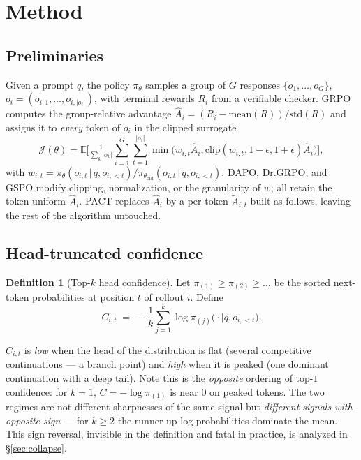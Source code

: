 \documentclass{article} %
\theoremstyle{plain}
\theoremstyle{definition}
\newtheorem{definition}[theorem]{Definition}
\theoremstyle{remark}
\newcommand{\method}{PACT}
\begin{document}
\section{Method}
\label{sec:method}

\subsection{Preliminaries}

Given a prompt $q$, the policy $\pi_\theta$ samples a group of $G$ responses $\{o_1,\dots,o_G\}$, $o_i=(o_{i,1},\dots,o_{i,|o_i|})$, with terminal rewards $R_i$ from a verifiable checker. GRPO computes the group-relative advantage $\hat A_i = (R_i - \mathrm{mean}(R))/\mathrm{std}(R)$ and assigns it to \emph{every} token of $o_i$ in the clipped surrogate
\begin{equation}
\mathcal{J}(\theta) = \mathbb{E}\Big[\tfrac{1}{\sum_k |o_k|}\sum_{i=1}^{G}\sum_{t=1}^{|o_i|} \min\big(w_{i,t}\hat A_{i}, \mathrm{clip}(w_{i,t},1{-}\epsilon,1{+}\epsilon)\hat A_{i}\big)\Big],
\label{eq:grpo}
\end{equation}
with $w_{i,t}=\pi_\theta(o_{i,t}\,|\,q,o_{i,<t})/\pi_{\theta_\mathrm{old}}(o_{i,t}\,|\,q,o_{i,<t})$. DAPO, Dr.GRPO, and GSPO modify clipping, normalization, or the granularity of $w$; all retain the token-uniform $\hat A_i$. \method{} replaces $\hat A_i$ by a per-token $\tilde A_{i,t}$ built as follows, leaving the rest of the algorithm untouched.

\subsection{Head-truncated confidence}
\label{sec:headconf}

\begin{definition}[Top-$k$ head confidence]
\label{def:conf}
Let $\pi_{(1)} \ge \pi_{(2)} \ge \dots$ be the sorted next-token probabilities at position $t$ of rollout $i$. Define
\begin{equation}
C_{i,t} \;=\; -\frac{1}{k}\sum_{j=1}^{k} \log \pi_{(j)}\big(\cdot \mid q, o_{i,<t}\big).
\end{equation}
\end{definition}

$C_{i,t}$ is \emph{low} when the head of the distribution is flat (several competitive continuations --- a branch point) and \emph{high} when it is peaked (one dominant continuation with a deep tail). Note this is the \emph{opposite} ordering of top-$1$ confidence: for $k=1$, $C=-\log \pi_{(1)}$ is near $0$ on peaked tokens. The two regimes are not different sharpnesses of the same signal but \emph{different signals with opposite sign} --- for $k\ge 2$ the runner-up log-probabilities dominate the mean. This sign reversal, invisible in the definition and fatal in practice, is analyzed in \S\ref{sec:collapse}.
\end{document}
